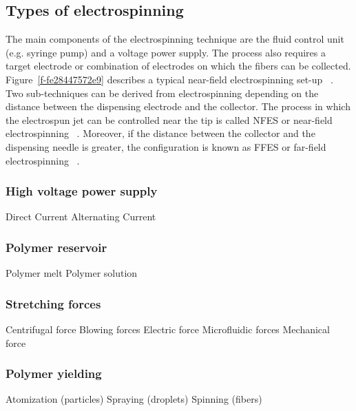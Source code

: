 \documentclass[5p,,preprint,12pt,twocolumn]{elsarticle}
\begin{document}
\subsection{Types of electrospinning }The main components of the electrospinning technique are the fluid control unit (e.g. syringe pump) and a voltage power supply. The process also requires a target electrode or combination of electrodes on which the fibers can be collected.  Figure~\ref{f-fe28447572e9} describes a typical near-field electrospinning set-up \unskip~\cite{527120:12073538}. Two sub-techniques can be derived from electrospinning depending on the distance between the dispensing electrode and the collector. The process in which the electrospun jet can be controlled near the tip is called NFES or near-field electrospinning \unskip~\cite{527120:12033655}. Moreover, if the distance between the collector and the dispensing needle is greater, the configuration is known as FFES or far-field electrospinning \unskip~\cite{527120:12073581}.



\subsubsection{High voltage power supply}Direct Current \mbox{}\protect\newline Alternating Current



\subsubsection{Polymer reservoir}Polymer melt \mbox{}\protect\newline Polymer solution



\subsubsection{Stretching forces}Centrifugal force \mbox{}\protect\newline Blowing forces \mbox{}\protect\newline Electric force \mbox{}\protect\newline Microfluidic forces \mbox{}\protect\newline Mechanical force



\subsubsection{Polymer yielding}Atomization (particles) \mbox{}\protect\newline Spraying (droplets) \mbox{}\protect\newline Spinning (fibers)
\end{document}
